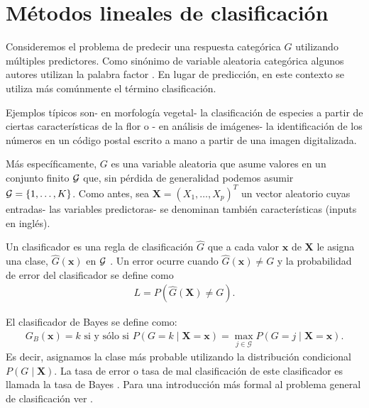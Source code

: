 \documentclass{report}
\begin{document}
 
  
   
 
   
 
 
 

\chapter{Métodos lineales de clasificación}\label{capclasif}


 Consideremos el problema de predecir una respuesta  categórica $G$ utilizando múltiples predictores. Como sinónimo de variable aleatoria categórica algunos autores utilizan la palabra  factor \cite{htf}. 
En lugar de predicción, en este contexto se utiliza más comúnmente el término clasificación.


 Ejemplos típicos son-  en morfología vegetal-  la clasificación de especies  a partir de ciertas características de la flor o - en  análisis de imágenes-  la identificación de los números en un código postal escrito a mano a partir de una imagen digitalizada.  


 Más específicamente, $G$ es una variable aleatoria que asume valores en un conjunto finito ${\cal G}$ que, sin pérdida de generalidad podemos asumir  ${\cal G}=\{1, \ldots, K\}$. Como antes, sea  $\mathbf{X}=(X_1,\ldots, X_p)^T$ un vector aleatorio cuyas entradas- las variables predictoras- se denominan también características (inputs en inglés). 

 Un clasificador  es una regla de clasificación  $\widehat{G}$ que a cada valor $\mathbf{x}$ de $\mathbf{X}$ le asigna una clase, $\widehat{G}(\mathbf{x})$ en ${\cal G}$ \citep{devroye1996}.  Un error ocurre cuando 
 $\widehat{G}(\mathbf{x})\neq G$ y la probabilidad de error del clasificador se define como
 \begin{eqnarray}\label{proberror}
 L=P(\widehat{G}(\mathbf{X})\neq G).	 
 \end{eqnarray}

 
 El clasificador de Bayes se define como:
 \begin{eqnarray}\label{clasBayes}
G_B(\mathbf{x})=k \text { si y sólo si } P\left(G=k \mid \mathbf{X}=\mathbf{x}\right)=\max _{j \in \mathcal{G}} P(G=j \mid \mathbf{X}=\mathbf{x}).
 \end{eqnarray}
 Es decir, asignamos la clase más probable utilizando la distribución condicional $P\left(G  \mid \mathbf{X} \right).$   La tasa de error o tasa de mal clasificación de este clasificador es llamada la tasa de Bayes \citep[p.~21]{htf}. Para una introducción más formal al problema general de clasificación ver \cite{bousquet}. 
 	
\end{document}
